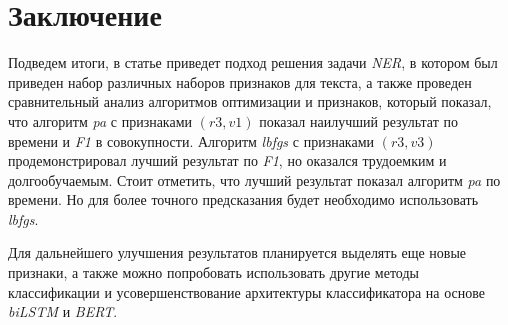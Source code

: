 \documentclass{csmathnotes}
\begin{document}
\section*{Заключение}
Подведем итоги, в статье приведет подход решения задачи \emph{NER}, в котором был приведен набор различных наборов признаков для текста, а также проведен сравнительный анализ алгоритмов оптимизации и признаков, который показал, что алгоритм \emph{pa} с признаками $(r3, v1)$ показал наилучший результат по времени и \emph{F1}  в совокупности. Алгоритм \emph{lbfgs}  с признаками $(r3, v3)$ продемонстрировал лучший результат по \emph{F1}, но оказался трудоемким и долгообучаемым. Стоит отметить, что лучший результат показал алгоритм \emph{pa} по времени. Но для более точного предсказания будет необходимо использовать \emph{lbfgs}.


Для дальнейшего улучшения результатов планируется выделять еще новые признаки, а также можно попробовать использовать другие методы классификации и усовершенствование архитектуры классификатора на основе \emph{biLSTM} и \emph{BERT}.

\printbibliography
\end{document}
